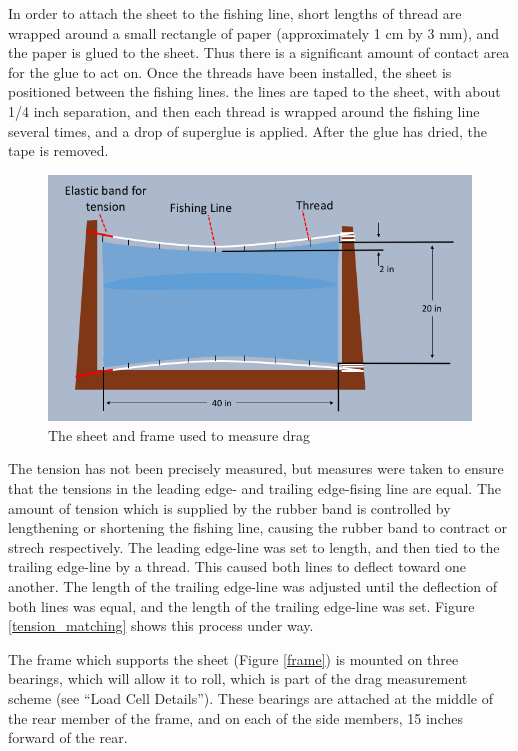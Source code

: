 \documentclass[12pt]{report} %
\begin{document}
In order to attach the sheet to the fishing line, short lengths of thread are wrapped around a small rectangle of paper (approximately 1 cm
by 3 mm), and the paper is glued to the sheet. Thus there is a significant amount of contact area for the glue to act on. Once the threads have
been installed, the sheet is positioned between the fishing lines. the lines are taped to the sheet, with about 1/4 inch separation, and then each
thread is wrapped around the fishing line several times, and a drop of superglue is applied. After the glue has dried, the tape is removed.

\begin{figure}
\includegraphics[width = \linewidth]{current.png}
\caption{The sheet and frame used to measure drag}
\label{current}
\end{figure}

The tension has not been precisely measured, but measures were taken to ensure that the tensions
in the leading edge- and trailing edge-fising line are equal. The amount of tension which is supplied by the rubber band is controlled by lengthening
or shortening the fishing line, causing the rubber band to contract or strech respectively. The leading edge-line was set to length, and then tied
to the trailing edge-line by a thread. This caused both lines to deflect toward one another. The length of the trailing edge-line was adjusted
until the deflection of both lines was equal, and the length of the trailing edge-line was set. Figure \ref{tension_matching} shows this process
under way.

The frame which supports the sheet (Figure \ref{frame}) is mounted on three bearings, which will allow it to roll,
which is part of the drag measurement scheme (see
``Load Cell Details''). These bearings are attached at the middle of the rear member of the frame, and on each of the side members, 15 inches
forward of the rear.
\end{document}
